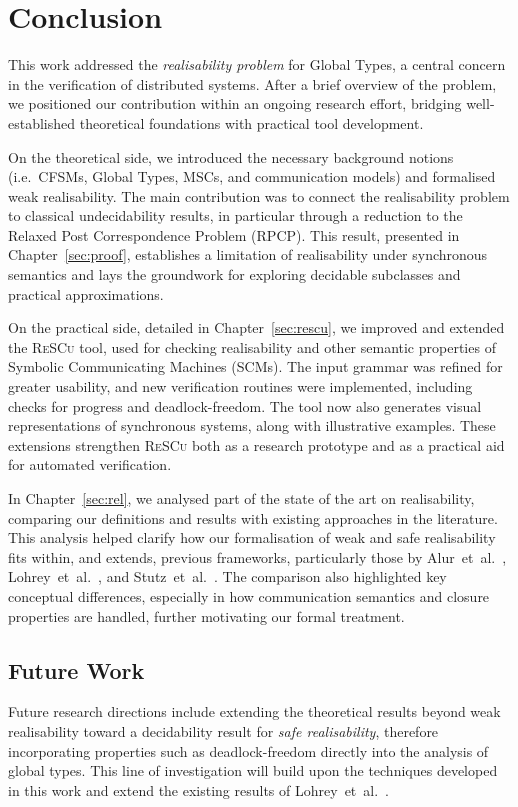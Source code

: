 \chapter{Conclusion}\label{sec:end}
This work addressed the \emph{realisability problem} for Global 
Types, a central concern in the verification of distributed systems. 
After a brief overview of the problem, we positioned our contribution 
within an ongoing research effort, bridging well-established 
theoretical foundations with practical tool development.  

On the theoretical side, we introduced the necessary background 
notions (i.e.\ CFSMs, Global Types, MSCs, and communication models) and 
formalised weak realisability. The main contribution was to connect 
the realisability problem to classical undecidability results, in 
particular through a reduction to the Relaxed Post Correspondence 
Problem (RPCP). This result, presented in 
Chapter~\ref{sec:proof}, establishes a limitation 
of realisability under synchronous semantics and lays the groundwork 
for exploring decidable subclasses and practical approximations.

On the practical side, detailed in Chapter~\ref{sec:rescu}, we improved 
and extended the \textsc{ReSCu} tool, used for checking realisability 
and other semantic properties of Symbolic Communicating Machines 
(SCMs). The input grammar was refined for greater usability, and new 
verification routines were implemented, including checks for progress 
and deadlock-freedom. The tool now also generates visual 
representations of synchronous systems, along with illustrative 
examples. These extensions strengthen \textsc{ReSCu} both as a research 
prototype and as a practical aid for automated verification.

In Chapter~\ref{sec:rel}, we analysed part of the state of the art on 
realisability, comparing our definitions and results with existing 
approaches in the literature. This analysis helped clarify how our 
formalisation of weak and safe realisability fits within, and extends, 
previous frameworks, particularly those by 
Alur~et~al.~\cite{alur2005realizability}, 
Lohrey~et~al.~\cite{lohrey2003realizability}, and 
Stutz~et~al.~\cite{stutz2024implementability}. The comparison also 
highlighted key conceptual differences, especially in how communication 
semantics and closure properties are handled, further motivating our 
formal treatment.

\section{Future Work}
Future research directions include extending the theoretical results
beyond weak realisability toward a decidability result for
\emph{safe realisability}, therefore incorporating properties such as
deadlock-freedom directly into the analysis of global types. This line
of investigation will build upon the techniques developed in this work
and extend the existing results of Lohrey~et~al.~\cite{lohrey2003realizability}.  

